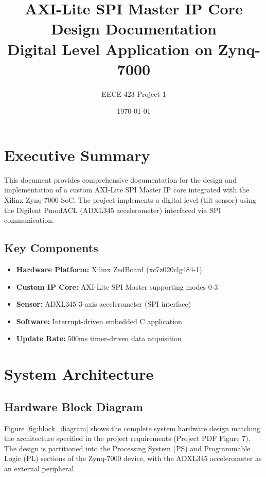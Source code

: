 \documentclass[11pt,a4paper]{article}
\title{\textbf{AXI-Lite SPI Master IP Core Design Documentation} \\
\large Digital Level Application on Zynq-7000}
\author{EECE 423 Project 1}
\date{\today}
\begin{document}
\maketitle
\tableofcontents
\newpage

\section{Executive Summary}

This document provides comprehensive documentation for the design and implementation of a custom AXI-Lite SPI Master IP core integrated with the Xilinx Zynq-7000 SoC. The project implements a digital level (tilt sensor) using the Digilent PmodACL (ADXL345 accelerometer) interfaced via SPI communication.

\subsection{Key Components}
\begin{itemize}[leftmargin=*]
    \item \textbf{Hardware Platform:} Xilinx ZedBoard (xc7z020clg484-1)
    \item \textbf{Custom IP Core:} AXI-Lite SPI Master supporting modes 0-3
    \item \textbf{Sensor:} ADXL345 3-axis accelerometer (SPI interface)
    \item \textbf{Software:} Interrupt-driven embedded C application
    \item \textbf{Update Rate:} 500ms timer-driven data acquisition
\end{itemize}

\section{System Architecture}

\subsection{Hardware Block Diagram}

Figure \ref{fig:block_diagram} shows the complete system hardware design matching the architecture specified in the project requirements (Project PDF Figure 7). The design is partitioned into the Processing System (PS) and Programmable Logic (PL) sections of the Zynq-7000 device, with the ADXL345 accelerometer as an external peripheral.
\end{document}
